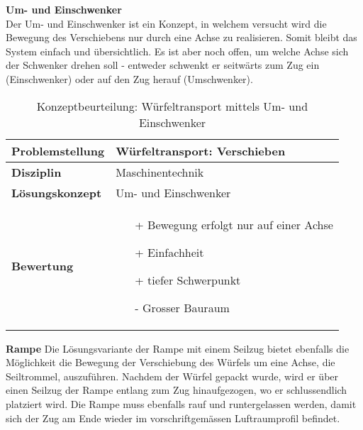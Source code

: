 \documentclass[../../main.tex]{subfiles}
\begin{document}
    \textbf{Um- und Einschwenker}\\

    Der Um- und Einschwenker ist ein Konzept, in welchem versucht wird die Bewegung des Verschiebens nur durch eine Achse zu realisieren. Somit bleibt das System einfach und übersichtlich. Es ist aber noch offen, um welche Achse sich der Schwenker drehen soll - entweder schwenkt er seitwärts zum Zug ein (Einschwenker) oder auf den Zug herauf (Umschwenker).\\

    \begin{flushleft}
        \begin{table}[h]
        \begin{tabular}{ | l | p{11cm} |}
        \hline
        \textbf{Problemstellung} & Würfeltransport: Verschieben \\ \hline
        \textbf{Disziplin} & Maschinentechnik \\ \hline
        \textbf{Lösungskonzept} &  Um- und Einschwenker \\ \hline
        \textbf{Bewertung} &  \begin{itemize}
                                \item[+] Bewegung erfolgt nur auf einer Achse
                                \item[+] Einfachheit
                                \item[+] tiefer Schwerpunkt
                                \item[-] Grosser Bauraum
                              \end{itemize} \\ \hline
        \end{tabular}
        \caption{Konzeptbeurteilung: Würfeltransport mittels Um- und Einschwenker}
        \label{tab:konzept_wurfeltrransport_umschwenker}
    \end{table}
    \end{flushleft}
    \textbf{Rampe}
    Die Lösungsvariante der Rampe mit einem Seilzug bietet ebenfalls die Möglichkeit die Bewegung der Verschiebung des Würfels um eine Achse, die Seiltrommel, auszuführen. Nachdem der Würfel gepackt wurde, wird er über einen Seilzug der Rampe entlang zum Zug hinaufgezogen, wo er schlussendlich platziert wird. Die Rampe muss ebenfalls rauf und runtergelassen werden, damit sich der Zug am Ende wieder im vorschriftgemässen Luftraumprofil befindet.\\
\end{document}
